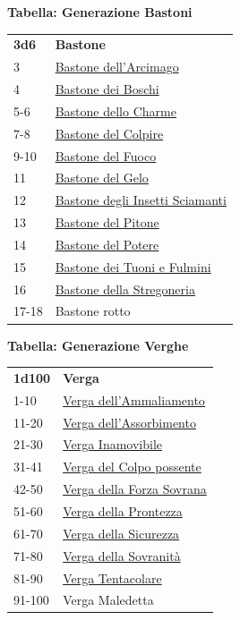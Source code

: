 \begin{multicols}{2}
{\medskip

\textbf{Tabella: Generazione Bastoni}\hypertarget{Bastoni}{}

\medskip

{\small\begin{tabularx}{0.45\textwidth}{lX}
\textbf{3d6} & \textbf{Bastone}\\
3 & \hyperlink{Bastonedell'Arcimago}{Bastone dell'Arcimago}\\
4 & \hyperlink{BastonedeiBoschi}{Bastone dei Boschi}\\
5-6 & \hyperlink{BastonedelloCharme}{Bastone dello Charme}\\
7-8 & \hyperlink{BastonedelColpire}{Bastone del Colpire}\\
9-10 & \hyperlink{BastonedelFuoco}{Bastone del Fuoco}\\
11 & \hyperlink{BastonedelGelo}{Bastone del Gelo}\\
12 & \hyperlink{BastonedegliInsettiSciamanti}{Bastone degli Insetti Sciamanti}\\
13 & \hyperlink{BastonedelPitone}{Bastone del Pitone}\\
14 & \hyperlink{BastonedelPotere}{Bastone del Potere}\\
15 & \hyperlink{BastonedeiTuonieFulmini}{Bastone dei Tuoni e Fulmini}\\
16 & \hyperlink{BastonedellaStregoneria}{Bastone della Stregoneria}\\
17-18 & Bastone rotto\\
\end{tabularx}}

\medskip

\textbf{Tabella: Generazione Verghe}\hypertarget{Verghe}{}

\medskip

{\small\begin{tabularx}{0.45\textwidth}{lX}
\textbf{1d100} & \textbf{Verga}\\
1-10 & \hyperlink{Vergadell'Ammaliamento}{Verga dell'Ammaliamento}\\
11-20 & \hyperlink{Vergadell'Assorbimento}{Verga dell'Assorbimento}\\
21-30 & \hyperlink{VergaInamovibile}{Verga Inamovibile}\\
31-41 & \hyperlink{VergadelColpopossente}{Verga del Colpo possente}\\
42-50 & \hyperlink{VergadellaForzaSovrana}{Verga della Forza Sovrana}\\
51-60 & \hyperlink{VergadellaProntezza}{Verga della Prontezza}\\
61-70 & \hyperlink{VergadellaSicurezza}{Verga della Sicurezza}\\
71-80 & \hyperlink{VergadellaSovranità}{Verga della Sovranità}\\
81-90 & \hyperlink{VergaTentacolare}{Verga Tentacolare}\\
91-100 & Verga Maledetta\\
\end{tabularx}}

}
\end{multicols}
